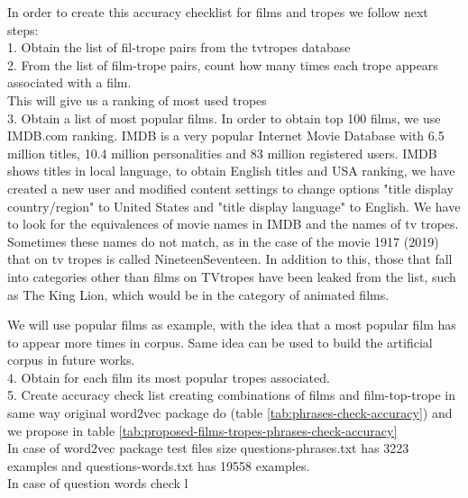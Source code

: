 \documentclass[letterpaper]{article}
\begin{document}
	
	In order to create this accuracy checklist for films and tropes we follow next steps:\\
	1. Obtain the list of fil-trope pairs from the tvtropes database\\
	2. From the list of film-trope pairs, count how many times each trope appears associated with a film.\\ This will give us a ranking of most used tropes\\
	3. Obtain a list of most popular films.
	In order to obtain top 100 films, we use IMDB.com ranking. IMDB is a very popular Internet Movie Database with 6.5 million titles, 10.4 million personalities and 83 million registered users. IMDB shows titles in local language, to obtain English titles and USA ranking, we have created a new user and modified content settings to change options "title display country/region" to United States and "title display language" to English. We have to look for the 
	equivalences of movie names in IMDB and the names of tv tropes. Sometimes these names do not match, as in the 
	case of the movie 1917 (2019) that on tv tropes is called NineteenSeventeen. In addition to this, those that fall into categories other than films on TVtropes have been leaked from the list, such as The King Lion, which would be in the category of animated films.
	
	
	We will use popular films as example, with the idea that a most popular film has to appear more times in corpus. Same idea can be used to build the artificial corpus in future works.\\
	4. Obtain for each film its most popular tropes associated.\\
	5. Create accuracy check list creating combinations of films and film-top-trope in same way original word2vec package do (table \ref{tab:phrases-check-accuracy}) and we propose in table \ref{tab:proposed-films-tropes-phrases-check-accuracy}\\ 
	
	In case of word2vec package test files size questions-phrases.txt has 3223 examples and questions-words.txt has 19558 examples.\\
	In case of question words check l
	
	
	
\end{document}
